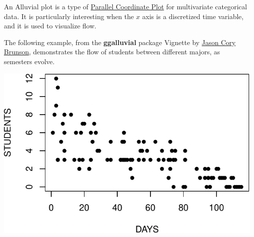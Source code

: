 \documentclass[]{book}
\newenvironment{Shaded}{\begin{snugshade}}{\end{snugshade}}
\newcommand{\KeywordTok}[1]{\textcolor[rgb]{0.13,0.29,0.53}{\textbf{#1}}}
\newcommand{\DataTypeTok}[1]{\textcolor[rgb]{0.13,0.29,0.53}{#1}}
\newcommand{\StringTok}[1]{\textcolor[rgb]{0.31,0.60,0.02}{#1}}
\newcommand{\OperatorTok}[1]{\textcolor[rgb]{0.81,0.36,0.00}{\textbf{#1}}}
\newcommand{\NormalTok}[1]{#1}
\theoremstyle{definition}
\theoremstyle{definition}
\theoremstyle{definition}
\theoremstyle{remark}
\begin{document}
An Alluvial plot is a type of \protect\hyperlink{parcoord}{Parallel
Coordinate Plot} for multivariate categorical data. It is particularly
interesting when the \(x\) axis is a discretized time variable, and it
is used to visualize flow.

The following example, from the \textbf{ggalluvial} package Vignette by
\href{https://cran.r-project.org/web/packages/ggalluvial/vignettes/ggalluvial.html}{Jason
Cory Brunson}, demonstrates the flow of students between different
majors, as semesters evolve.

\begin{Shaded}
\end{Shaded}

\includegraphics[width=0.5\linewidth]{Rcourse_files/figure-latex/unnamed-chunk-144-1}
\end{document}
